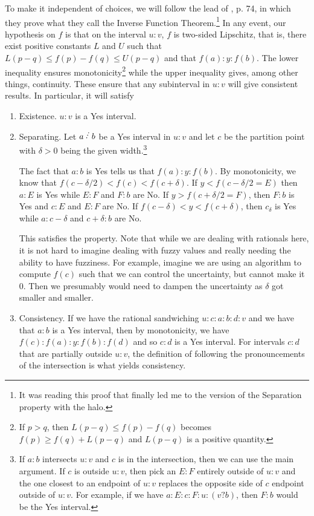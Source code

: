 \documentclass[12pt]{article}
\begin{document}
To make it independent of choices, we will follow the lead of \cite{bridger}, p. 74, in which they prove what they call the Inverse Function Theorem.\footnote{It was reading this proof that finally led me to the version of the Separation property with the halo.} In any event, our hypothesis on $f$ is that on the interval $u:v$, $f$ is two-sided Lipschitz, that is, there exist positive constants $L$ and $U$ such that $L (p-q) \leq f(p) - f(q) \leq U (p-q)$ and that $f(a):y:f(b)$. The lower inequality ensures monotonicity\footnote{If $p > q$, then $L(p-q) \leq f(p) - f(q)$ becomes $f(p) \geq f(q) + L(p-q)$ and $L(p-q)$ is a positive quantity.} while the upper inequality gives, among other things, continuity. These ensure that any subinterval in $u:v$ will give consistent results. In particular, it will satisfy

\begin{enumerate}
    \item Existence. $u:v$ is a Yes interval.

    \item Separating. Let $a \lte b$ be a Yes interval in $u:v$ and let $c$ be the partition point with $\delta>0$ being the given width.\footnote{If $a:b$ intersects $u:v$ and $c$ is in the intersection, then we can use the main argument. If $c$ is outside $u:v$, then pick an $E:F$ entirely outside of $u:v$ and the one closest to an endpoint of $u:v$ replaces the opposite side of $c$ endpoint outside of $u:v$. For example, if we have $a:E:c:F:u:(v?b)$, then $F:b$ would be the Yes interval.}
    
    The fact that $a:b$ is Yes tells us that $f(a):y:f(b)$. By monotonicity, we know that $f(c - \delta/2) < f(c) < f(c+\delta)$. If $y < f(c-\delta/2 = E)$ then $a:E$ is Yes while $E:F$ and $F:b$ are No. If $y > f(c + \delta/2 = F)$, then $F:b$ is Yes and $c:E$ and $E:F$ are No. If $f(c-\delta) < y < f(c+\delta)$, then $c_\delta$ is Yes while $a:c-\delta$ and $c+\delta : b$ are No. 

    This satisfies the property. Note that while we are dealing with rationals here, it is not hard to imagine dealing with fuzzy values and really needing the ability to have fuzziness. For example, imagine we are using an algorithm to compute $f(c)$ such that we can control the uncertainty, but cannot make it 0. Then we presumably would need to dampen the uncertainty as $\delta$ got smaller and smaller. 
        
    \item Consistency. If we have the rational sandwiching $u:c:a:b:d:v$ and we have that $a:b$ is a Yes interval, then by monotonicity, we have $f(c):f(a):y:f(b):f(d)$ and so $c:d$ is a Yes interval. For intervals $c:d$ that are partially outside $u:v$, the definition of following the pronouncements of the intersection is what yields consistency.


\end{enumerate}
\end{document}
